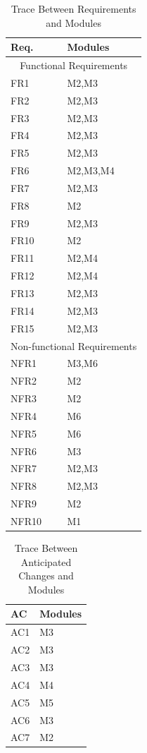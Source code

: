 \documentclass[12pt, titlepage]{article}
\begin{document}
\begin{table}[H]
\centering
\begin{tabular}{p{} p{}}
\toprule
\textbf{Req.} & \textbf{Modules}\\
\midrule
\multicolumn{2}{c}{Functional Requirements}\\
\midrule
FR1 & M2,M3\\
FR2 & M2,M3\\
FR3 & M2,M3\\
FR4 & M2,M3\\
FR5 & M2,M3\\
FR6 & M2,M3,M4\\
FR7 & M2,M3\\
FR8 & M2\\
FR9 & M2,M3\\
FR10 & M2\\
FR11 & M2,M4\\
FR12 & M2,M4\\
FR13 & M2,M3\\
FR14 & M2,M3\\
FR15 & M2,M3\\
\midrule
\multicolumn{2}{c}{Non-functional Requirements}\\
\midrule
NFR1 & M3,M6\\
NFR2 & M2\\
NFR3 & M2\\
NFR4 & M6\\
NFR5 & M6\\
NFR6 & M3\\
NFR7 & M2,M3\\
NFR8 & M2,M3\\
NFR9 & M2\\
NFR10 & M1\\

\bottomrule
\end{tabular}
\caption{Trace Between Requirements and Modules}
\label{TblRT}
\end{table}

\begin{table}[H]
\centering
\begin{tabular}{p{} p{}}
\toprule
\textbf{AC} & \textbf{Modules}\\
\midrule
AC1 & M3\\
AC2 & M3\\
AC3 & M3\\
AC4 & M4\\
AC5 & M5\\
AC6 & M3\\
AC7 & M2\\
\bottomrule
\end{tabular}
\caption{Trace Between Anticipated Changes and Modules}
\label{TblACT}
\end{table}
\end{document}
